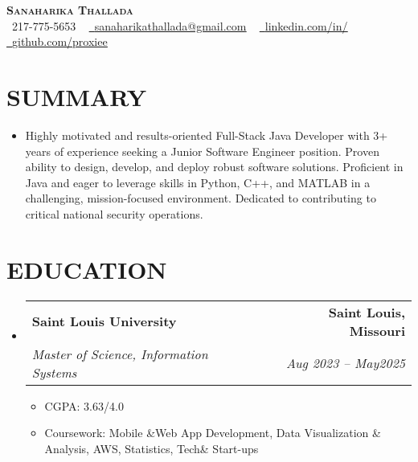 \documentclass[letterpaper,11pt]{article}
\makeatletter
\newcommand{\resumeItem}[1]{\item\small{{#1 \vspace{-3pt}}}}
\newcommand{\resumeSubheading}[4]{\vspace{-2pt}\item\begin{tabular*}{0.97\textwidth}[t]{l@{\extracolsep{\fill}}r}\textbf{#1} & #2 \\ \textit{\small#3} & \textit{\small #4} \\ \end{tabular*}\vspace{-7pt}}
\newcommand{\resumeSubHeadingListStart}{\begin{itemize}[leftmargin=0.15in, label={}]}
\newcommand{\resumeSubHeadingListEnd}{\end{itemize}}
\newcommand{\resumeItemListStart}{\begin{itemize}}
\newcommand{\resumeItemListEnd}{\end{itemize}\vspace{-5pt}}
\makeatother
\begin{document}
\begin{center}
    \textbf{\Huge \scshape {\fontsize{15pt}{20pt}\selectfont Sanaharika Thallada}} \\ \vspace{1pt}
    \small \raisebox{-0.1\height}\faPhone\ 217-775-5653 ~ \href{mailto:sanaharikathallada@gmail.com}{\raisebox{-0.2\height}\faEnvelope\  \underline{sanaharikathallada@gmail.com}} ~ 
    \href{https://www.linkedin.com/in/yashwanthtirupati/}{\raisebox{-0.2\height}\faLinkedin\ \underline{linkedin.com/in/}} ~ 
    \href{https://github.com/proxiee}{\raisebox{-0.2\height}\faGithub\ \underline{github.com/proxiee}}
    \vspace{-8pt}
\end{center}

\section{{\fontsize{9pt}{20pt}\selectfont \textbf{SUMMARY}}}\resumeSubHeadingListStart
\resumeItem{Highly motivated and results-oriented Full-Stack Java Developer with 3+ years of experience seeking a Junior Software Engineer position. Proven ability to design, develop, and deploy robust software solutions.  Proficient in Java and eager to leverage skills in Python, C++, and MATLAB in a challenging, mission-focused environment.  Dedicated to contributing to critical national security operations.}
\resumeSubHeadingListEnd\vspace{-18pt}
\section{{\fontsize{9pt}{20pt}\selectfont \textbf{EDUCATION}}}\resumeSubHeadingListStart
\resumeSubheading{Saint Louis University}{\textbf{Saint Louis, Missouri}}{Master of Science, Information Systems}{Aug 2023 – May2025}
\resumeItemListStart
\resumeItem{CGPA: 3.63/4.0}
\resumeItem{Coursework: Mobile \&Web App Development, Data Visualization \& Analysis, AWS, Statistics, Tech\& Start-ups}
\resumeItemListEnd
\resumeSubHeadingListEnd\vspace{-18pt}
\end{document}
